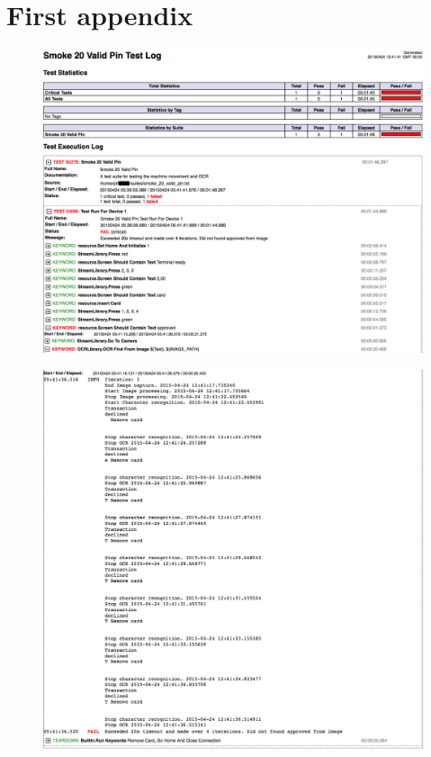 
\chapter{First appendix}
\label{chapter:first-appendix}

\begin{figure}[htbp]
\begin{center}
\includegraphics[width=1\textwidth]{images/first_log.png}
\label{fig:passed}
\end{center}
\end{figure}

\begin{figure}[htbp]
\begin{center}
\includegraphics[width=1\textwidth]{images/second_log.png}
\label{fig:passed_2}
\end{center}
\end{figure}

%